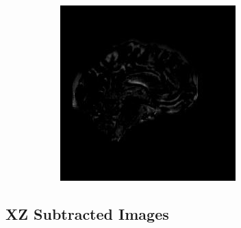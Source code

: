 \documentclass[12pt, fleqn, titlepage]{article}
\newcommand\skipperer{0.45pt}
\begin{document}
\begin{figure}[H]
\begin{subfigure}[b]{0.8\textwidth}
		\hskip\skipperer
		\includegraphics[width=0.22\linewidth]{imgs/subtracted_images/xy/136_S_0196_yz_1.5_1.5gen_comparison}
	\end{subfigure}
	\caption{}
	\label{}
\end{figure}

\subsection{XZ Subtracted Images}\label{xz_subtracted_images}
\end{document}
